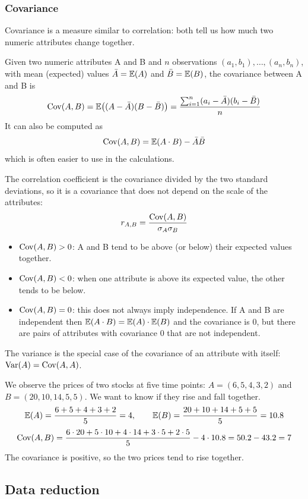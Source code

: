 \subsubsection{Covariance}
Covariance is a measure similar to correlation: both tell us how much two numeric attributes change together.

\begin{definition}[Covariance]
Given two numeric attributes A and B and $n$ observations $(a_1,b_1),\dots,(a_n,b_n)$, with mean (expected) values $\bar{A}=\mathbb{E}(A)$ and $\bar{B}=\mathbb{E}(B)$, the covariance between A and B is
\[
    \operatorname{Cov}(A,B) = \mathbb{E}\big((A-\bar{A})(B-\bar{B})\big) = \frac{\sum_{i=1}^{n}(a_i-\bar{A})(b_i-\bar{B})}{n}
\]
It can also be computed as
\[
    \operatorname{Cov}(A,B) = \mathbb{E}(A\cdot B) - \bar{A}\bar{B}
\]
which is often easier to use in the calculations.
\end{definition}

The correlation coefficient is the covariance divided by the two standard deviations, so it is a covariance that does not depend on the scale of the attributes:
\[
    r_{A,B} = \frac{\operatorname{Cov}(A,B)}{\sigma_A\sigma_B}
\]

\begin{itemize}
    \item $\operatorname{Cov}(A,B)>0$: A and B tend to be above (or below) their expected values together.
    \item $\operatorname{Cov}(A,B)<0$: when one attribute is above its expected value, the other tends to be below.
    \item $\operatorname{Cov}(A,B)=0$: this does not always imply independence. If A and B are independent then $\mathbb{E}(A\cdot B)=\mathbb{E}(A)\cdot\mathbb{E}(B)$ and the covariance is 0, but there are pairs of attributes with covariance 0 that are not independent.
\end{itemize}
The variance is the special case of the covariance of an attribute with itself: $\operatorname{Var}(A)=\operatorname{Cov}(A,A)$.

\begin{example}
We observe the prices of two stocks at five time points: $A = (6,5,4,3,2)$ and $B = (20,10,14,5,5)$. We want to know if they rise and fall together.
\[
    \mathbb{E}(A) = \frac{6+5+4+3+2}{5} = 4, \qquad \mathbb{E}(B) = \frac{20+10+14+5+5}{5} = 10.8
\]
\[
    \operatorname{Cov}(A,B) = \frac{6\cdot 20+5\cdot 10+4\cdot 14+3\cdot 5+2\cdot 5}{5} - 4\cdot 10.8 = 50.2-43.2 = 7
\]
The covariance is positive, so the two prices tend to rise together.
\end{example}

\subsection{Data reduction}

